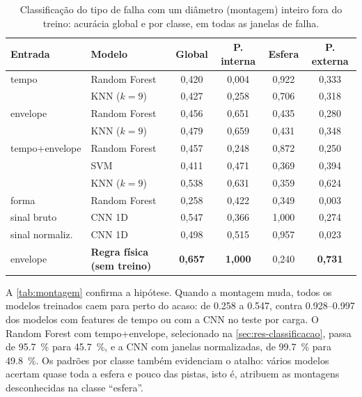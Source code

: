 \begin{table}[htb]
  \centering
  \caption{Classificação do tipo de falha com um diâmetro (montagem) inteiro fora
  do treino: acurácia global e por classe, em todas as janelas de falha.}
  \label{tab:montagem}
  \footnotesize
  \begin{tabular}{llcccc}
    \toprule
    \textbf{Entrada} & \textbf{Modelo} & \textbf{Global} & \textbf{P. interna} &
    \textbf{Esfera} & \textbf{P. externa} \\
    \midrule
    tempo           & Random Forest & 0,420 & 0,004 & 0,922 & 0,333 \\
                    & KNN ($k=9$)   & 0,427 & 0,258 & 0,706 & 0,318 \\
    envelope        & Random Forest & 0,456 & 0,651 & 0,435 & 0,280 \\
                    & KNN ($k=9$)   & 0,479 & 0,659 & 0,431 & 0,348 \\
    tempo+envelope  & Random Forest & 0,457 & 0,248 & 0,872 & 0,250 \\
                    & SVM           & 0,411 & 0,471 & 0,369 & 0,394 \\
                    & KNN ($k=9$)   & 0,538 & 0,631 & 0,359 & 0,624 \\
    forma           & Random Forest & 0,258 & 0,422 & 0,349 & 0,003 \\
    sinal bruto     & CNN 1D        & 0,547 & 0,366 & 1,000 & 0,274 \\
    sinal normaliz. & CNN 1D        & 0,498 & 0,515 & 0,957 & 0,023 \\
    \midrule
    envelope        & \textbf{Regra física (sem treino)} & \textbf{0,657} & \textbf{1,000} & 0,240 & \textbf{0,731} \\
    \bottomrule
  \end{tabular}
\end{table}

A \autoref{tab:montagem} confirma a hipótese. Quando a montagem muda, todos os
modelos treinados caem para perto do acaso: de \num{0.258} a \num{0.547}, contra
\numrange{0.928}{0.997} dos modelos com features de tempo ou com a CNN no teste por
carga. O Random Forest com tempo+envelope,
selecionado na \autoref{sec:res-classificacao}, passa de \SI{95.7}{\percent} para
\SI{45.7}{\percent}, e a CNN com janelas normalizadas, de \SI{99.7}{\percent} para
\SI{49.8}{\percent}. Os padrões por classe também evidenciam o atalho: vários
modelos acertam quase toda a esfera e pouco das pistas, isto é, atribuem as
montagens desconhecidas na classe ``esfera''.

